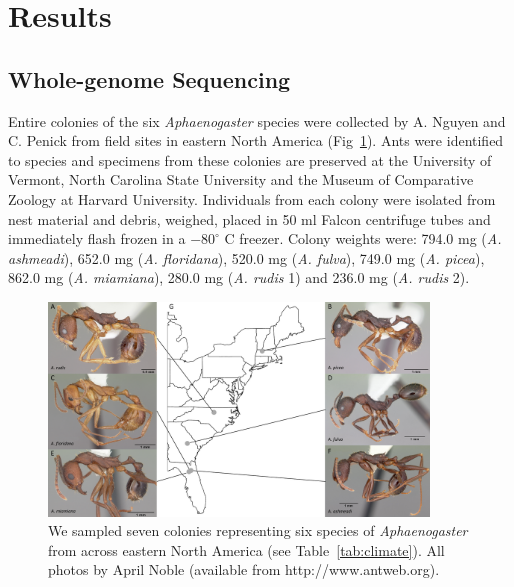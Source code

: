 \documentclass[fleqn,10pt,lineno]{wlpeerj} %
\begin{document}
\section*{Results}

\subsection*{Whole-genome Sequencing}

Entire colonies of the six \textit{Aphaenogaster} species were
collected by A. Nguyen and C. Penick from field sites in eastern North
America (Fig~\ref{fig:sampling}). Ants were identified to species and
specimens from these colonies are preserved at the University of
Vermont, North Carolina State University and the Museum of Comparative
Zoology at Harvard University. Individuals from each colony were
isolated from nest material and debris, weighed, placed in 50 ml
Falcon centrifuge tubes and immediately flash frozen in a
$-80^{\circ}$ C freezer. Colony weights were: 794.0 mg
(\textit{A. ashmeadi}), 652.0 mg (\textit{A. floridana}), 520.0 mg
(\textit{A. fulva}), 749.0 mg (\textit{A. picea}), 862.0 mg
(\textit{A. miamiana}), 280.0 mg (\textit{A. rudis} 1) and 236.0 mg
(\textit{A. rudis} 2).

\begin{figure}[ht]
\includegraphics[width = 0.9\textwidth]{map_apg.pdf}
\caption{We sampled seven colonies representing six species of
  \textit{Aphaenogaster} from across eastern North America (see
  Table~\ref{tab:climate}). All photos by April Noble (available from
  http://www.antweb.org).}
\label{fig:sampling}
\end{figure}
\end{document}
